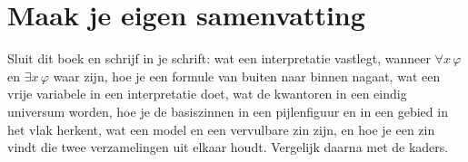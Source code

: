 
\ifzelfstudie
\section*{Maak je eigen samenvatting}
Sluit dit boek en schrijf in je schrift: wat een interpretatie vastlegt, wanneer $\forall x\, \varphi$ en $\exists x\, \varphi$ waar zijn, hoe je een formule van buiten naar binnen nagaat, wat een vrije variabele in een interpretatie doet, wat de kwantoren in een eindig universum worden, hoe je de basiszinnen in een pijlenfiguur en in een gebied in het vlak herkent, wat een model en een vervulbare zin zijn, en hoe je een zin vindt die twee verzamelingen uit elkaar houdt. Vergelijk daarna met de kaders.
\fi

